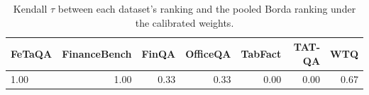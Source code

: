 \begin{table}[t]
\centering
\small
\caption{Kendall $\tau$ between each dataset's ranking and the pooled Borda ranking under the calibrated weights.}
\label{tab:dsagree}

\begin{tabular}{lrrrrrr}
\toprule
FeTaQA & FinanceBench & FinQA & OfficeQA & TabFact & TAT-QA & WTQ \\
\midrule
1.00 & 1.00 & 0.33 & 0.33 & 0.00 & 0.00 & 0.67 \\
\bottomrule
\end{tabular}

\end{table}